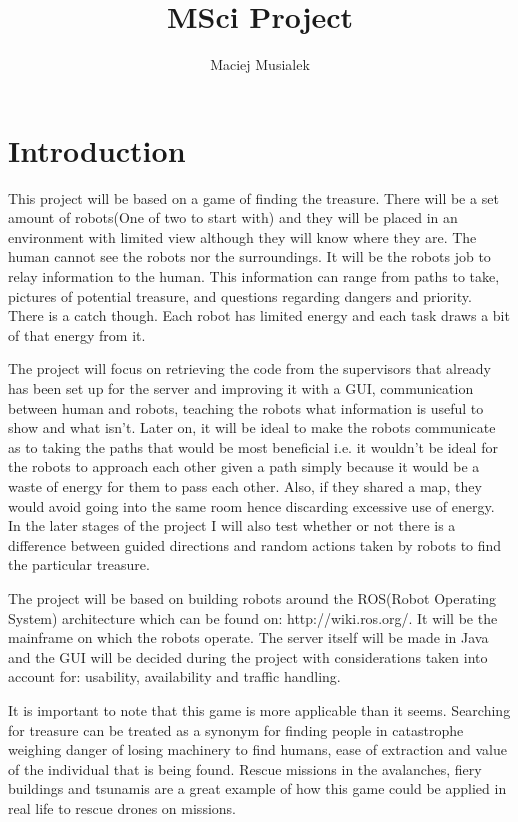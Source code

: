\documentclass{report}
\begin{document}
  
  \title{MSci Project}
  \author{Maciej Musialek}
  \maketitle

  \tableofcontents

  \chapter{Introduction}
  This project will be based on a game of finding the treasure. There will be a set amount of robots(One of two to start with) and they will be placed in an environment with limited view although they will know where they are. The human cannot see the robots nor the surroundings. It will be the robots job to relay information to the human. This information can range from paths to take, pictures of potential treasure, and questions regarding dangers and priority. There is a catch though. Each robot has limited energy and each task draws a bit of that energy from it. 

  The project will focus on retrieving the code from the supervisors that already has been set up for the server and improving it with a GUI, communication between human and robots, teaching the robots what information is useful to show and what isn't. Later on, it will be ideal to make the robots communicate as to taking the paths that would be most beneficial i.e. it wouldn't be ideal for the robots to approach each other given a path simply because it would be a waste of energy for them to pass each other. Also, if they shared a map, they would avoid going into the same room hence discarding excessive use of energy. In the later stages of the project I will also test whether or not there is a difference between guided directions and random actions taken by robots to find the particular treasure. 

  The project will be based on building robots around the ROS(Robot Operating System) architecture which can be found on: http://wiki.ros.org/. It will be the mainframe on which the robots operate. The server itself will be made in Java and the GUI will be decided during the project with considerations taken into account for: usability, availability and traffic handling.

  It is important to note that this game is more applicable than it seems. Searching for treasure can be treated as a synonym for finding people in catastrophe weighing danger of losing machinery to find humans, ease of extraction and value of the individual that is being found. Rescue missions in the avalanches, fiery buildings and tsunamis are a great example of how this game could be applied in real life to rescue drones on missions.
\end{document}
